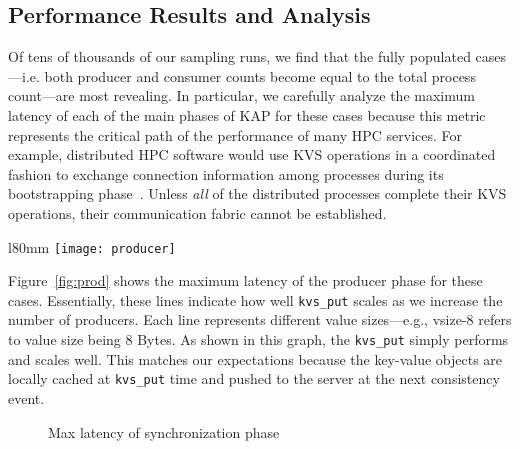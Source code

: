 \subsection{Performance Results and Analysis}
\label{results}
Of tens of thousands of our sampling runs, we find that the fully populated
cases---i.e. both producer and consumer counts become equal to the total
process count---are most revealing. In particular, we carefully analyze 
the maximum latency of each of the main phases of KAP for these cases 
because this metric represents the critical path of the performance of
many HPC services. For example, distributed 
HPC software would use KVS operations in a coordinated fashion to exchange 
connection information among processes during its bootstrapping 
phase~\cite{LIBI,PMI2}. Unless {\em all} 
of the distributed processes complete their
KVS operations, their communication fabric cannot be established. 

\begin{wrapfigure}{l}{80mm} 
  \centering
  \texttt{[image: producer]}
  \caption{Max latency of producer phase}
  \vspace{-.5cm}	
  \label{fig:prod}
\end{wrapfigure}

Figure~\ref{fig:prod} shows the maximum latency of the producer phase
for these cases. Essentially, these lines indicate how well {\tt kvs\_put}
scales as we increase the number of producers. Each line represents
different value sizes---e.g., vsize-8 refers to value size being
8 Bytes. As shown in this graph, the {\tt kvs\_put} simply performs and
scales well. This matches our expectations because the key-value objects
are locally cached at {\tt kvs\_put} time and pushed to the
server at the next consistency event. 

\ifcomments
{}

\begin{figure}[ht]
\centering
\begin{subfigure}[With unique values]{
  \texttt{[image: sync]}
  \label{fig:sync:noredund}
}%
\end{subfigure}
\begin{subfigure}[With redundant values]{
  \texttt{[image: sync]}
  \label{fig:sync:redund}
}%
\end{subfigure}
\caption{Max latency of synchronization phase}
\label{fig:sync}
\end{figure}



